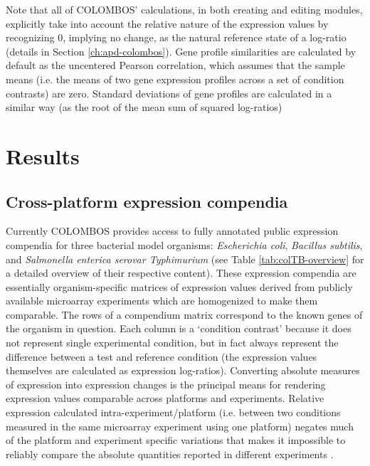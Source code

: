 Note that all of COLOMBOS' calculations, in both creating and editing modules, 
explicitly take into account the relative nature of the expression values by 
recognizing 0, implying no change, as the natural reference state of a 
log-ratio (details in Section \ref{ch:apd-colombos}). 
Gene profile similarities are calculated by default as the uncentered Pearson 
correlation, which assumes that the sample means (i.e. the means of two gene 
expression profiles across a set of condition contrasts) are zero. Standard 
deviations of gene profiles are calculated in a similar way (as the root of the 
mean sum of squared log-ratios)



\section{Results}

\subsection{Cross-platform expression compendia}\label{sec:colombos-comp}
Currently COLOMBOS provides access to fully annotated public expression 
compendia for three bacterial model organisms: {\it Escherichia coli}, {\it 
Bacillus subtilis}, and {\it Salmonella enterica serovar Typhimurium} (see 
Table \ref{tab:colTB-overview} for a detailed overview of their respective 
content). 
These expression compendia are essentially organism-specific matrices of 
expression values derived from publicly available microarray experiments which 
are homogenized to make them comparable. The rows of a compendium matrix 
correspond to the known genes of the organism in question. Each column is a 
`condition contrast' because it does not represent single experimental 
condition, but in fact always represent the difference between a 
test and reference condition (the expression values themselves are calculated 
as expression log-ratios). Converting absolute measures of expression into 
expression changes is the principal means for rendering expression values 
comparable across platforms and experiments. Relative expression calculated 
intra-experiment/platform (i.e. between two conditions measured in the same 
microarray experiment using one platform) negates much of the platform and 
experiment specific variations that makes it impossible to reliably compare the 
absolute quantities reported in different experiments \cite{Shi2006}.


